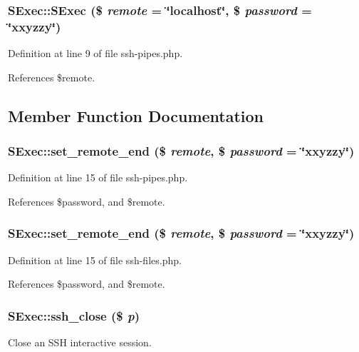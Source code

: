 \subsubsection{\setlength{\rightskip}{0pt plus 5cm}SExec::SExec (\$ {\em remote} = \char`\"{}localhost\char`\"{}, \$ {\em password} = \char`\"{}xxyzzy\char`\"{})}\label{classSExec_a11}




Definition at line 9 of file ssh-pipes.php.

References \$remote.

\subsection{Member Function Documentation}
\subsubsection{\setlength{\rightskip}{0pt plus 5cm}SExec::set\_\-remote\_\-end (\$ {\em remote}, \$ {\em password} = \char`\"{}xxyzzy\char`\"{})}\label{classSExec_a12}




Definition at line 15 of file ssh-pipes.php.

References \$password, and \$remote.
\subsubsection{\setlength{\rightskip}{0pt plus 5cm}SExec::set\_\-remote\_\-end (\$ {\em remote}, \$ {\em password} = \char`\"{}xxyzzy\char`\"{})}\label{classSExec_a1}




Definition at line 15 of file ssh-files.php.

References \$password, and \$remote.
\subsubsection{\setlength{\rightskip}{0pt plus 5cm}SExec::ssh\_\-close (\$ {\em p})}\label{classSExec_a18}


Close an SSH interactive session. 



